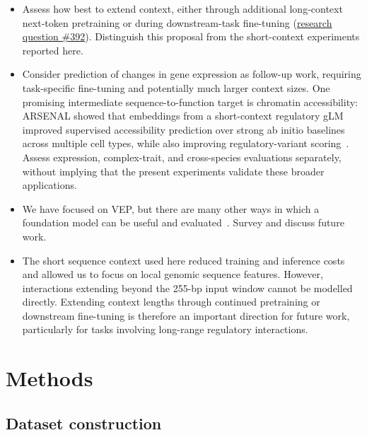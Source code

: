 \documentclass[a4paper,num-refs]{oup-contemporary}
\begin{document}
\begin{itemize}
encoders with further training, so that the initial causal architecture need
not permanently constrain the model to left-to-right representations
(\href{https://github.com/Open-Athena/marin-dna/issues/393}{research question
\#393}).
\item Assess how best to extend context, either through additional long-context
next-token pretraining or during downstream-task fine-tuning
(\href{https://github.com/Open-Athena/marin-dna/issues/392}{research question
\#392}).
Distinguish this proposal from the short-context experiments reported here.
\item Consider prediction of changes in gene expression as follow-up work,
requiring task-specific fine-tuning and potentially much larger context sizes.
One promising intermediate sequence-to-function target is chromatin
accessibility: ARSENAL showed that embeddings from a short-context regulatory
gLM improved supervised accessibility prediction over strong ab initio
baselines across multiple cell types, while also improving regulatory-variant
scoring~\citep{patel2026arsenal}. Assess expression, complex-trait, and
cross-species
evaluations separately, without implying that the present experiments validate
these broader applications.
\item We have focused on VEP, but there are many other ways in which a
foundation model can be useful and evaluated~\cite{feng2025benchmarking}.
Survey and discuss future work.

\item The short sequence context used here reduced training and inference costs
and allowed us to focus on local genomic sequence features.
However, interactions extending beyond the 255-bp input window cannot
be modelled directly.
Extending context lengths through continued pretraining or downstream
fine-tuning is therefore an important direction for future work,
particularly for tasks involving long-range regulatory interactions.

\end{itemize}

\section{Methods}
\subsection{Dataset construction}\label{methods:data}
\end{document}
